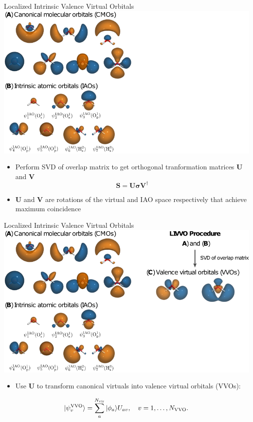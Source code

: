 \documentclass[t]{beamer}
\begin{document}
\begin{frame}{Localized Intrinsic Valence Virtual Orbitals}
\centering
\includegraphics[width=0.75\linewidth]{livvo_procedure_2.png}
\begin{itemize}
\item Perform SVD of overlap matrix to get orthogonal tranformation matrices $\mathbf{U}$ and $\mathbf{V}$
\begin{equation}
\mathbf{S} = \mathbf{U} \boldsymbol{
\sigma} \mathbf{V}^{\dagger}
\end{equation}
\item $\mathbf{U}$ and $\mathbf{V}$ are rotations of the virtual and IAO space respectively that achieve maximum coincidence
\end{itemize}
\end{frame}


\begin{frame}{Localized Intrinsic Valence Virtual Orbitals}
\centering
\includegraphics[width=0.75\linewidth]{livvo_procedure_3.png}
\begin{itemize}
\item Use $\mathbf{U}$ to transform canonical virtuals into valence virtual orbitals (VVOs):
\end{itemize}
\begin{equation}
| \psi^{\rm VVO}_v \rangle = \sum_a^{N_\mathrm{vir}} | \phi_a \rangle U_{av}, \quad v = 1, \ldots, N_{\rm VVO}.
\end{equation}
\end{frame}
\end{document}
